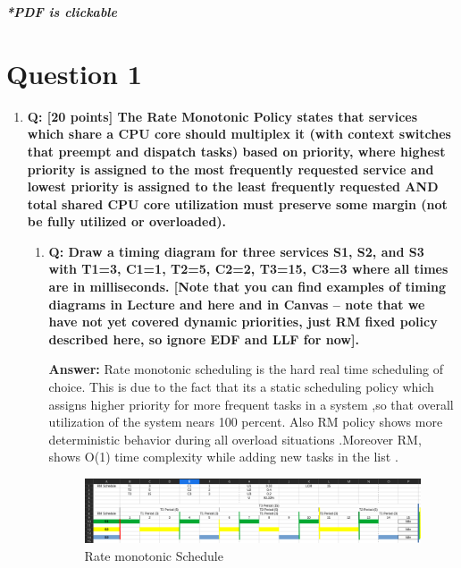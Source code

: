 \documentclass[a4paper,11pt]{article}%
\newenvironment{qanda}{\setlength{\parindent}{0pt}}{\bigskip}
\newcommand{\Q}{\bigskip\bfseries Q: }
\newcommand{\A}{\par\textbf{Answer: } \normalfont}
\begin{document}



\pagebreak

\tableofcontents
\listoffigures
\listoftables
\vfill
\begin{center}
	\textbf{\textit{*PDF is clickable}}
\end{center}

\pagebreak



\begin{qanda}
	\section{Question 1}
	\begin{enumerate}
		\item[] \Q [20 points] The Rate Monotonic Policy states that services which share a CPU core should multiplex it (with context switches that preempt and dispatch tasks) based on priority, where highest priority is assigned to the most frequently requested service and lowest priority is assigned to the least frequently requested AND total shared CPU core utilization must preserve some margin (not be fully utilized or overloaded).
			\begin{enumerate}
				\item \Q Draw a timing diagram for three services S1, S2, and S3 with T1=3, C1=1, T2=5, C2=2, T3=15, C3=3 where all times are in milliseconds. [Note that you can find examples of timing diagrams in Lecture and here and in Canvas – note that we have not yet covered dynamic priorities, just RM fixed policy described here, so ignore EDF and LLF for now].

				\A Rate monotonic scheduling is the hard real time scheduling of choice. This is due to the fact that
				its a static scheduling policy which assigns higher priority for more frequent tasks in a system ,so that
				overall utilization of the system nears 100 percent. Also RM policy shows more deterministic behavior
				during all overload situations .Moreover RM, shows O(1) time complexity while adding new tasks in
				the list . 



	\begin{figure}[H]
		\centering
		\includegraphics[scale=0.37]{figures/rm.png}
		\caption{Rate monotonic Schedule}
		\label{rm}
	\end{figure}
				      

\end{enumerate}
\end{enumerate}
\end{qanda}
\end{document}
